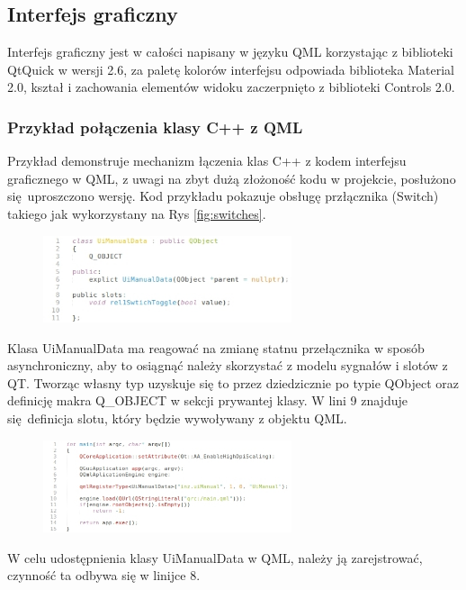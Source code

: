 \documentclass[12pt, eng, twoside, openany, final]{mgr}
\begin{document}
                \subsection{Interfejs graficzny}
                Interfejs graficzny jest w całości napisany w języku QML korzystając z biblioteki QtQuick w wersji 2.6, za paletę kolorów interfejsu odpowiada biblioteka Material 2.0, kształ i zachowania elementów widoku zaczerpnięto z biblioteki Controls 2.0. 
                
                \subsubsection{Przykład połączenia klasy C++ z QML}
                Przykład demonstruje mechanizm łączenia klas C++ z kodem interfejsu graficznego w QML, z uwagi na zbyt dużą złożoność kodu w projekcie, posłużono się uproszczono wersję. Kod przykładu pokazuje obsługę przłącznika (Switch) takiego jak wykorzystany na Rys \ref{fig:switches}.
                    \begin{figure}[H]
                    \begin{center}
                        \includegraphics[width=0.65\textwidth]{code_class.jpg}
                    \end{center}
                    \end{figure}
                    Klasa UiManualData ma reagować na zmianę statnu przełącznika w sposób asynchroniczny, aby to osiągnąć należy skorzystać z modelu sygnałów i slotów z QT. Tworząc własny typ uzyskuje się to przez dziedzicznie po typie QObject oraz definicję makra Q\_OBJECT w sekcji prywantej klasy. W lini 9 znajduje się definicja slotu, który będzie wywoływany z objektu QML.
                    
                    \begin{figure}[H]
                    \begin{center}
                        \includegraphics[width=0.65\textwidth]{code_main.jpg}
                    \end{center}
                    \end{figure}
                    W celu udostępnienia klasy UiManualData w QML, należy ją zarejstrować, czynność ta odbywa się w linijce 8.
                    
\end{document}
